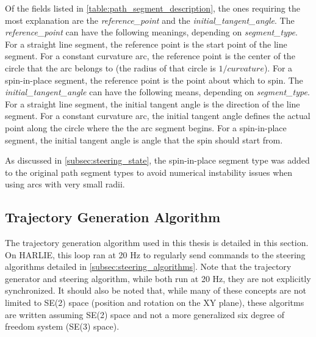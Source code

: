 Of the fields listed in \autoref{table:path_segment_description}, the ones requiring the most explanation are the \emph{reference\_point} and the \emph{initial\_tangent\_angle}. The \emph{reference\_point} can have the following meanings, depending on \emph{segment\_type}. For a straight line segment, the reference point is the start point of the line segment. For a constant curvature arc, the reference point is the center of the circle that the arc belongs to (the radius of that circle is $1/curvature$). For a spin-in-place segment, the reference point is the point about which to spin. The \emph{initial\_tangent\_angle} can have the following means, depending on \emph{segment\_type}. For a straight line segment, the initial tangent angle is the direction of the line segment. For a constant curvature arc, the initial tangent angle defines the actual point along the circle where the the arc segment begins. For a spin-in-place segment, the initial tangent angle is angle that the spin should start from.

As discussed in \autoref{subsec:steering_state}, the spin-in-place segment type was added to the original path segment types to avoid numerical instability issues when using arcs with very small radii.

\subsection{Trajectory Generation Algorithm}\label{subsec:trajectory_generation_algorithm}

The trajectory generation algorithm used in this thesis is detailed in this section. On HARLIE, this loop ran at 20 Hz to regularly send commands to the steering algorithms detailed in \autoref{subsec:steering_algorithms}. Note that the trajectory generator and steering algorithm, while both run at 20 Hz, they are not explicitly synchronized. It should also be noted that, while many of these concepts are not limited to SE(2) space (position and rotation on the XY plane), these algoritms are written assuming SE(2) space and not a more generalized six degree of freedom system (SE(3) space). 


